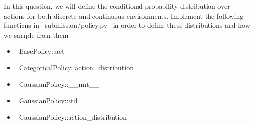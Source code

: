 \item {}

In this question, we will define the conditional probability distribution over actions for both discrete and continuous environments. Implement the following functions in ~submission/policy.py~ in order to define these distributions and how we sample from them: 

\begin{itemize}
	\item ~BasePolicy::act~ 
	\item ~CategoricalPolicy::action_distribution~ 
	\item ~GaussianPolicy::__init__~ 
	\item ~GaussianPolicy::std~
	\item ~GaussianPolicy::action_distribution~ 
\end{itemize}
